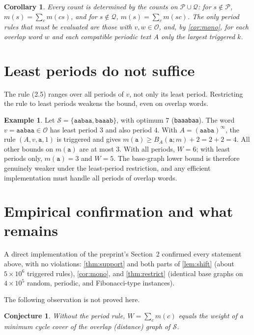 \documentclass[11pt]{article}
\numberwithin{equation}{section}
\newtheorem{corollary}[theorem]{Corollary}
\newtheorem{conjecture}[theorem]{Conjecture}
\theoremstyle{definition}
\newtheorem{example}[theorem]{Example}
\newcommand{\Pre}{\mathcal P}
\newcommand{\Suf}{\mathcal Q}
\newcommand{\Ov}{\mathcal O}
\begin{document}
\begin{corollary}\label{cor:determined}
Every count is determined by the counts on $\Pre\cup\Suf$: for
$s\notin\Pre$, $m(s)=\sum_c m(cs)$, and for $s\notin\Suf$,
$m(s)=\sum_c m(sc)$. The only period rules that must be evaluated are those with
$v,w\in\Ov$, and, by \cref{cor:mono}, for each overlap word $w$ and each
compatible periodic text $A$ only the largest triggered $k$.
\end{corollary}

\section{Least periods do not suffice}

The rule (2.5) ranges over all periods of $v$, not only its least period. Restricting the rule to least
periods weakens the bound, even on overlap words.

\begin{example}\label{ex:least}
Let $\mathcal S=\{\texttt{aabaa},\texttt{baaab}\}$, with optimum $7$
(\texttt{baaabaa}). The word $v=\texttt{aabaa}\in\Ov$ has least period $3$ and
also period $4$. With $A=(\texttt{aaba})^\infty$, the rule $(A,v,\texttt{a},1)$
is triggered and gives $m(\texttt{a})\ge B_A(\texttt{a};m)+2=2+2=4$. All other
bounds on $m(\texttt{a})$ are at most $3$. With all periods, $W=6$; with least
periods only, $m(\texttt{a})=3$ and $W=5$. The base-graph lower bound is
therefore genuinely weaker under the least-period restriction, and any
efficient implementation must handle all periods of overlap words.
\end{example}

\section{Empirical confirmation and what remains}

A direct implementation of the preprint's Section~2 confirmed every statement above,
with no violations: \cref{thm:support} and both parts of \cref{lem:shift}
(about $5\times10^6$ triggered rules), \cref{cor:mono}, and
\cref{thm:restrict} (identical base graphs on $4\times10^5$ random,
periodic, and Fibonacci-type instances).

The following observation is not proved here.

\begin{conjecture}
Without the period rule, $W=\sum_c m(c)$ equals the weight of a minimum cycle
cover of the overlap (distance) graph of $\mathcal S$.
\end{conjecture}
\end{document}
